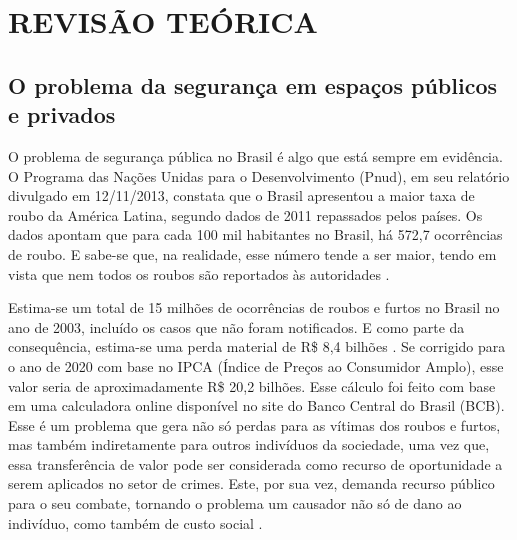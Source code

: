 \chapter{\MakeUppercase{Revisão Teórica}}
\label{cap:rev.teorica}
\thispagestyle{plain}

\vspace{-3em} %

\graphicspath{{./Cap2_Revisao_Teorica/Figures/}}

\section{O problema da segurança em espaços públicos e privados}
O problema de segurança pública no Brasil é algo que está sempre em evidência. O Programa das Nações Unidas para o Desenvolvimento (Pnud), em seu relatório divulgado em 12/11/2013, constata que o Brasil apresentou a maior taxa de roubo da América Latina, segundo dados de 2011 repassados pelos países. Os dados apontam que para cada 100 mil habitantes no Brasil, há 572,7 ocorrências de roubo. E sabe-se que, na realidade, esse número tende a ser maior, tendo em vista que nem todos os roubos são reportados às autoridades \cite{G12013}.

Estima-se um total de 15 milhões de ocorrências de roubos e furtos no Brasil no ano de 2003, incluído os casos que não foram notificados. E como parte da consequência, estima-se uma perda material de R\$ 8,4 bilhões \cite{Cerqueira2007}. Se corrigido para o ano de 2020 com base no IPCA (Índice de Preços ao Consumidor Amplo), esse valor seria de aproximadamente R\$ 20,2 bilhões. Esse cálculo foi feito com base em uma calculadora online disponível no site do Banco Central do Brasil (BCB). Esse é um problema que gera não só perdas para as vítimas dos roubos e furtos, mas também indiretamente para outros indivíduos da sociedade, uma vez que, essa transferência de valor pode ser considerada como recurso de oportunidade a serem aplicados no setor de crimes. Este, por sua vez, demanda recurso público para o seu combate, tornando o problema um causador não só de dano ao indivíduo, como também de custo social \cite{Anderson1999, Cerqueira2007}.

